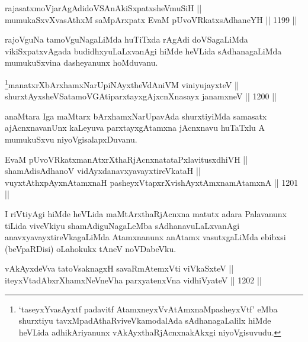 
\begin{shl}
rajasatxmoVjarAgAdidoVSAnAkiSxpatxsheVmuSiH || \\
mumukaSxvXvasAthxM saMpArxpatx EvaM pUvoVRkatxsAdhaneYH \hfill || 1199 ||  
\end{shl}

\begin{artha}
rajoVguNa tamoVguNagaLiMda huTiTxda rAgAdi doVSagaLiMda vikiSxpatxvAgada budidhxyuLaLxvanAgi hiMde heVLida sAdhanagaLiMda mumukuSxvina dasheyanunx hoMduvanu.
\end{artha}



\begin{shl}
\footnote{`taseyxYvasAyxtf padavitf AtamxneyxVvA\s\s tAmxnaMpasheyxVtf' eMba shurxtiyu tavxMpadAthaRviveVkamodalAda sAdhanagaLalilx hiMde heVLida adhikAriyanunx vAkAyxthaRjAcnxnakAkxgi niyoVgisuvudu.}manatxrXbArxhamxNarUpiNAyx\s theVdAniVM viniyujayxteV || \\
shurxtAyx\s sheVSatamoVGAtiparxtayxgAjxcnXnasayx janamxneV \hfill || 1200 ||  
\end{shl}

\begin{artha}
anaMtara Iga maMtarx bArxhamxNarUpavAda shurxtiyiMda samasatx ajAcnxnavanUnx kaLeyuva parxtayxgAtamxna jAcnxnavu huTaTxlu A mumukuSxvu niyoVgisalapxDuvanu.
\end{artha}


\begin{shl}
EvaM pUvoVRkatxmanAtxrXthaRjAcnxnatataPxlavitusxdhiVH || \\
shamAdisAdhanoV vidAyxdanavxyavayxtireVkataH || \\
vuyxtAthxpAyxnAtamxnaH pasheyxVtapxrXvishAyx\s \s tAmxnamAtamxnA \hfill || 1201 || 
\end{shl} 

\begin{artha}
I riVtiyAgi hiMde heVLida maMtArxthaRjAcnxna matutx adara Palavanunx tiLida viveVkiyu shamAdiguNagaLeMba sAdhanavuLaLxvanAgi anavxyavayxtireVkagaLiMda Atamxnanunx anAtamx vasutxgaLiMda ebibxsi (beVpaRDisi) oLahokukx tAneV noVDabeVku.
\end{artha}

\begin{shl}
vAkAyxdeVva tatoV\s saknagxH savaRmAtemxVti viVkaSxteV || \\
iteyxVtadAbxrXhamxNeVneVha parxyatenxVna vidhiVyateV \hfill || 1202 ||  
\end{shl}

